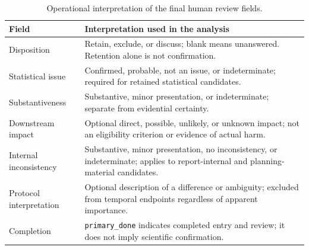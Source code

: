 \documentclass[11pt,a4paper]{article}
\begin{document}
\begin{table}[htbp]
\centering\small
\caption{Operational interpretation of the final human review fields.}
\label{tab:codebook}
\begin{tabularx}{\linewidth}{p{3.5cm}X}
\toprule
Field & Interpretation used in the analysis \\
\midrule
Disposition & Retain, exclude, or discuss; blank means unanswered. Retention alone is not confirmation. \\
Statistical issue & Confirmed, probable, not an issue, or indeterminate; required for retained statistical candidates. \\
Substantiveness & Substantive, minor presentation, or indeterminate; separate from evidential certainty. \\
Downstream impact & Optional direct, possible, unlikely, or unknown impact; not an eligibility criterion or evidence of actual harm. \\
Internal inconsistency & Substantive, minor presentation, no inconsistency, or indeterminate; applies to report-internal and planning-material candidates. \\
Protocol interpretation & Optional description of a difference or ambiguity; excluded from temporal endpoints regardless of apparent importance. \\
Completion & \texttt{primary\_done} indicates completed entry and review; it does not imply scientific confirmation. \\
\bottomrule
\end{tabularx}
\end{table}
\end{document}

